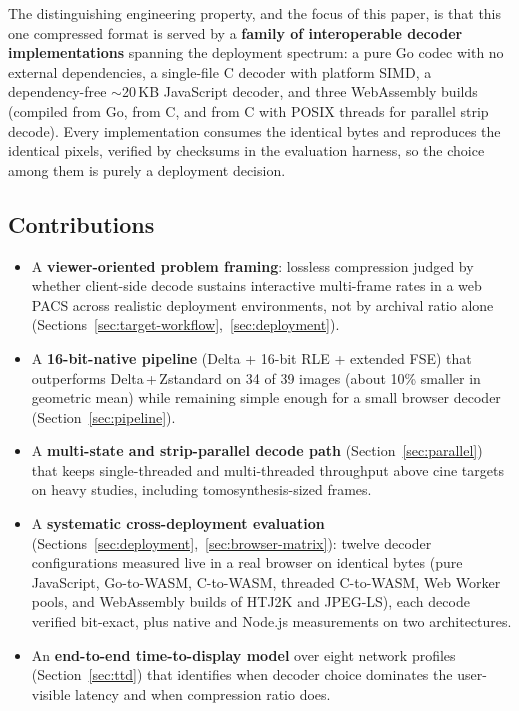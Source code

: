 \documentclass[journal]{IEEEtran}
\begin{document}
The distinguishing engineering property, and the focus of this paper, is that
this one compressed format is served by a \textbf{family of interoperable
decoder implementations} spanning the deployment spectrum: a pure Go codec
with no external dependencies, a single-file C decoder with platform SIMD, a
dependency-free ${\sim}$20\,KB JavaScript decoder, and three WebAssembly
builds (compiled from Go, from C, and from C with POSIX threads for parallel
strip decode). Every implementation consumes the identical bytes and
reproduces the identical pixels, verified by checksums in the evaluation
harness, so the choice among them is purely a deployment decision.

\subsection{Contributions}

\begin{itemize}
  \item A \textbf{viewer-oriented problem framing}: lossless compression
  judged by whether client-side decode sustains interactive multi-frame rates
  in a web PACS across realistic deployment environments, not by archival
  ratio alone (Sections~\ref{sec:target-workflow},~\ref{sec:deployment}).
  \item A \textbf{16-bit-native pipeline} (Delta + 16-bit RLE + extended FSE)
  that outperforms Delta\,+\,Zstandard on 34 of 39 images (about 10\% smaller
  in geometric mean) while remaining simple enough for a small browser
  decoder (Section~\ref{sec:pipeline}).
  \item A \textbf{multi-state and strip-parallel decode path}
  (Section~\ref{sec:parallel}) that keeps single-threaded and multi-threaded
  throughput above cine targets on heavy studies, including
  tomosynthesis-sized frames.
  \item A \textbf{systematic cross-deployment evaluation}
  (Sections~\ref{sec:deployment},~\ref{sec:browser-matrix}): twelve decoder
  configurations measured live in a real browser on identical bytes (pure
  JavaScript, Go-to-WASM, C-to-WASM, threaded C-to-WASM, Web Worker pools,
  and WebAssembly builds of HTJ2K and JPEG-LS), each decode verified
  bit-exact, plus native and Node.js measurements on two architectures.
  \item An \textbf{end-to-end time-to-display model} over eight network
  profiles (Section~\ref{sec:ttd}) that identifies when decoder choice
  dominates the user-visible latency and when compression ratio does.
\end{itemize}
\end{document}
